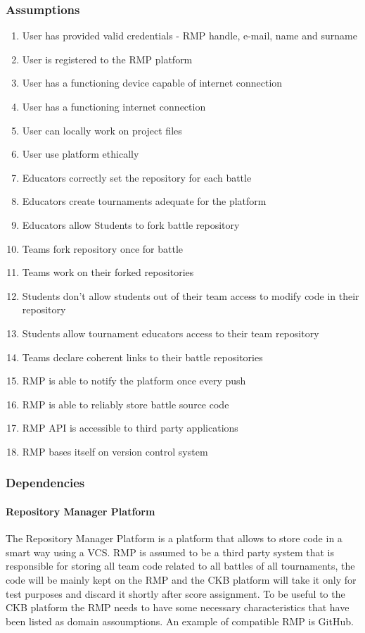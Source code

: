 \subsubsection{Assumptions}
\begin{enumerate}[label=$\bullet$ \textbf{D\arabic*:}]
    \item User has provided valid credentials - RMP handle, e-mail, name and surname
    \item User is registered to the RMP platform
    \item User has a functioning device capable of internet connection
    \item User has a functioning internet connection
    \item User can locally work on project files
    \item User use platform ethically
    \item Educators correctly set the repository for each battle
    \item Educators create tournaments adequate for the platform
    \item Educators allow Students to fork battle repository
    \item Teams fork repository once for battle
    \item Teams work on their forked repositories
    \item Students don't allow students out of their team access to modify code in their repository
    \item Students allow tournament educators access to their team repository
    \item Teams declare coherent links to their battle repositories
    \item RMP is able to notify the platform once every push
    \item RMP is able to reliably store battle source code
    \item RMP API is accessible to third party applications
    \item RMP bases itself on version control system
\end{enumerate}

\subsubsection{Dependencies}
\paragraph{Repository Manager Platform}
The Repository Manager Platform is a platform that allows to store code in a smart way using a VCS.
RMP is assumed to be a third party system that is responsible for storing all team code related to all battles of all tournaments, the code will be mainly kept on the RMP and the CKB platform will take it only for test purposes and discard it shortly after score assignment. 
To be useful to the CKB platform the RMP needs to have some necessary characteristics that have been listed as domain assoumptions.
An example of compatible RMP is GitHub.

